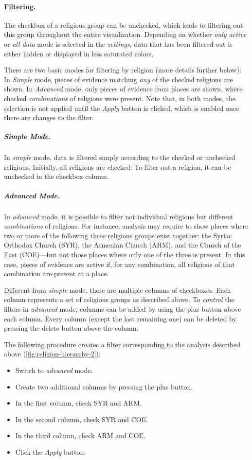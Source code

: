 \paragraph{Filtering.}
The checkbox of a religious group can be unchecked, which leads to filtering out this group throughout the entire visualization.
Depending on whether \emph{only active} or \emph{all data} mode is selected in the \emph{settings,} data that has been filtered out is either hidden or displayed in less saturated colors.

There are two basic modes for filtering by religion (more details further below):
In \emph{Simple} mode, pieces of evidence matching \emph{any} of the checked religions are shown.
In \emph{Advanced} mode, only pieces of evidence from places are shown, where checked \emph{combinations} of religions were present.
Note that, in both modes, the selection is not applied until the \emph{Apply} button is clicked, which is enabled once there are changes to the filter.

\subparagraph{Simple Mode.}
In \emph{simple} mode, data is filtered simply according to the checked or unchecked religions.
Initially, all religions are checked.
To filter out a religion, it can be unchecked in the checkbox column.

\subparagraph{Advanced Mode.}
\label{sec:religion-view-advanced-mode}
In \emph{advanced} mode, it is possible to filter not individual religions but different \emph{combinations} of religions.
For instance, analysis may require to show places where two or more of the following three religious groups exist together: the Syriac Orthodox Church (SYR), the Armenian Church (ARM), and the Church of the East (COE)---but not those places where only one of the three is present.
In this case, pieces of evidence are active if, for any combination, all religions of that combination are present at a place.

Different from \emph{simple} mode, there are multiple columns of checkboxes.
Each column represents a set of religious groups as described above.
To \emph{control} the filters in \emph{advanced} mode, columns can be added by using the plus button above each column.
Every column (except the last remaining one) can be deleted by pressing the delete button above the column.

The following procedure creates a filter corresponding to the analysis described above (\cref{fig:religion-hierarchy-2}):

\begin{itemize}
  \item Switch to \emph{advanced} mode.
  \item Create two additional columns by pressing the plus button.
  \item In the first column, check SYR and ARM.
  \item In the second column, check SYR and COE.
  \item In the third column, check ARM and COE.
  \item Click the \emph{Apply} button.
\end{itemize}

